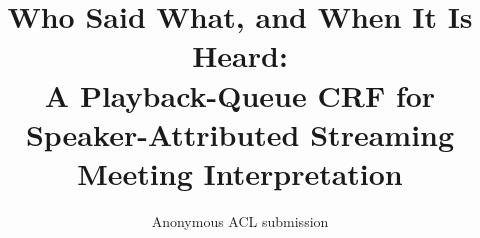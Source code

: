 \documentclass[11pt]{article}
\title{Who Said What, and When It Is Heard:\\
A Playback-Queue CRF for Speaker-Attributed Streaming Meeting Interpretation}
\author{Anonymous ACL submission}
\begin{document}
\maketitle











\appendix
\makeatletter
\renewcommand{\thesection}{\ifnum\c@section>26 A\@Alph{\numexpr\c@section-26\relax}\else\@Alph{\c@section}\fi}
\makeatother

\end{document}
